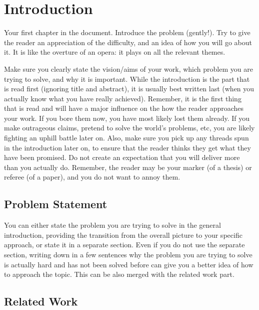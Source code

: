\chapter{Introduction}
\label{sec:introduction}

Your first chapter in the document.
Introduce the problem (gently!). Try to give the reader an appreciation of the difficulty, and an idea of how you will go about it. It is like the overture of an opera: it plays on all the relevant themes.

Make sure you clearly state the vision/aims of your work, which problem you are trying to solve, and why it is important. While the introduction is the part that is read first (ignoring title and abstract), it is usually best written last (when you actually know what you have really achieved). Remember, it is the first thing that is read and will have a major influence on the how the reader approaches your work. If you bore them now, you have most likely lost them already. If you make outrageous claims, pretend to solve the world's problems, etc, you are likely fighting an uphill battle later on. Also, make sure you pick up any threads spun in the introduction later on, to ensure that the reader thinks they get what they have been promised. Do not create an expectation that you will deliver more than you actually do. Remember, the reader may be your marker (of a thesis) or referee (of a paper), and you do not want to annoy them.

\section{Problem Statement}

You can either state the problem you are trying to solve in the general introduction, providing the transition from the overall picture to your specific approach, or state it in a separate section. Even if you do not use the separate section, writing down in a few sentences why the problem you are trying to solve is actually hard and has not been solved before can give you a better idea of how to approach the topic. This can be also merged with the related work part.

\section{Related Work}


